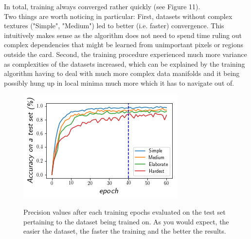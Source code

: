 \documentclass[a4paper]{article}
\begin{document}
In total, training always converged rather quickly (see Figure 11).\\
Two things are worth noticing in particular: 
 First, datasets without complex textures ("Simple", "Medium") led to better (i.e. faster) convergence. This intuitively makes sense as the algorithm does not need to spend time ruling out complex dependencies that might be learned from unimportant pixels or regions outside the card. Second, the training procedure experienced much more variance as complexities of the datasets increased, which can be explained by the training algorithm having to deal with much more complex data manifolds and it being possibly hung up in local minima much more which it has to navigate out of. \\
\begin{figure}

\includegraphics[scale=1]{images/loss}
\label{fig:curve}
\caption{Precision values after each training epochs evaluated on the test set pertaining to the dataset being trained on. As you would expect, the easier the dataset, the faster the training and the better the results. }


\end{figure}
\end{document}
